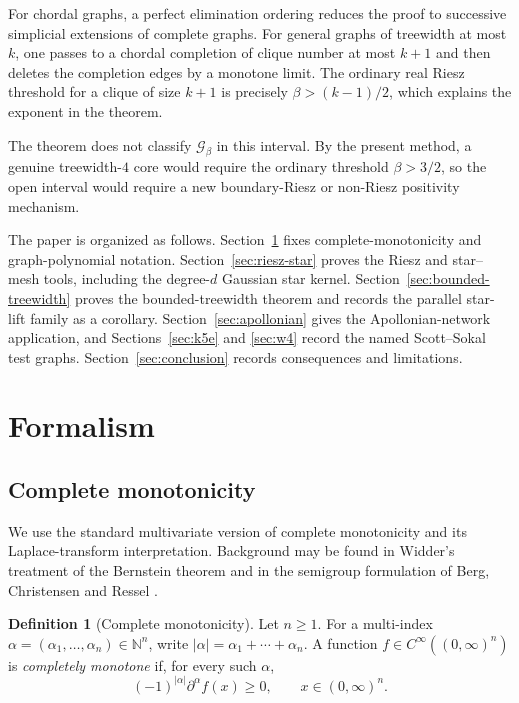 \documentclass[preprint,12pt,authoryear]{elsarticle}
\numberwithin{equation}{section}
\theoremstyle{definition}
\newtheorem{definition}[theorem]{Definition}
\theoremstyle{remark}
\newcommand{\N}{\mathbb{N}}
\newcommand{\calG}{\mathcal{G}}
\newcommand{\1}{\mathbf{1}}
\begin{document}
For chordal graphs, a perfect elimination ordering reduces the proof to successive simplicial extensions of complete graphs.  For general graphs of treewidth at most \(k\), one passes to a chordal completion of clique number at most \(k+1\) and then deletes the completion edges by a monotone limit.  The ordinary real Riesz threshold for a clique of size \(k+1\) is precisely \(\beta>(k-1)/2\), which explains the exponent in the theorem.

The theorem does not classify \(\calG_\beta\) in this interval.  By the present method, a genuine treewidth-\(4\) core would require the ordinary threshold \(\beta>3/2\), so the open interval would require a new boundary-Riesz or non-Riesz positivity mechanism.

The paper is organized as follows.  Section~\ref{sec:formalism} fixes complete-monotonicity and graph-polynomial notation.  Section~\ref{sec:riesz-star} proves the Riesz and star--mesh tools, including the degree-\(d\) Gaussian star kernel.  Section~\ref{sec:bounded-treewidth} proves the bounded-treewidth theorem and records the parallel star-lift family as a corollary.  Section~\ref{sec:apollonian} gives the Apollonian-network application, and Sections~\ref{sec:k5e} and \ref{sec:w4} record the named Scott--Sokal test graphs.  Section~\ref{sec:conclusion} records consequences and limitations.

\section{Formalism}
\label{sec:formalism}

\subsection{Complete monotonicity}

We use the standard multivariate version of complete monotonicity and its Laplace-transform interpretation.  Background may be found in Widder's treatment of the Bernstein theorem and in the semigroup formulation of Berg, Christensen and Ressel \cite{Widder,BergChristensenRessel}.

\begin{definition}[Complete monotonicity]
Let $n\ge1$.  For a multi-index \(\alpha=(\alpha_1,\ldots,\alpha_n)\in\N^n\), write \(|\alpha|=\alpha_1+\cdots+\alpha_n\).  A function \(f\in C^\infty((0,\infty)^n)\) is \emph{completely monotone} if, for every such \(\alpha\),
\begin{equation}
        (-1)^{|\alpha|}\partial^\alpha f(x)\ge0,
        \qquad x\in(0,\infty)^n .
\end{equation}
\end{definition}
\end{document}
